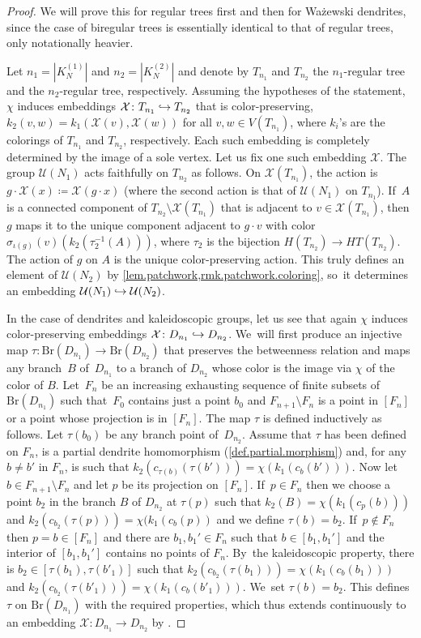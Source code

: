 \documentclass[JEP,XML,SOM,Unicode,NoFloatCountersInSection,published]{cedram}
\newcommand\hto{\mathrel{\lhook\joinrel\to}}
\theoremstyle{plain}
\theoremstyle{definition}
\theoremstyle{remark}
\newcommand{\U}{\mathcal{U}}
\newcommand{\Chi}{\mathcal{X}}
\newcommand{\Br}{\mathrm{Br}}
\begin{document}
\begin{proof}
We will prove this for regular trees first and then for Ważewski dendrites, since the case of biregular trees is essentially identical to that of regular trees, only notationally heavier.

Let $n_1 = |K_N^{(1)}|$ and $n_2 = |K_N^{(2)}|$ and denote by $T_{n_1}$ and $T_{n_2}$ the $n_1$-regular tree and the $n_2$-regular tree, respectively.
Assuming the hypotheses of the statement, $\chi$ induces embeddings $\Chi \colon T_{n_1} \hto T_{n_2}$ that is color-preserving, \ie $k_2(v,w) = k_1(\Chi(v),\Chi(w))$ for all $v,w\in V(T_{n_1})$, where $k_i$'s are the colorings of $T_{n_1}$ and $T_{n_2}$, respectively.
Each such embedding is completely determined by the image of a sole vertex.
Let us fix one such embedding $\Chi$.
The group $\U(N_1)$ acts faithfully on $T_{n_2}$ as follows.
On $\Chi(T_{n_1})$, the action is $g \cdot \Chi(x) \coloneqq \Chi(g \cdot x)$ (where the second action is that of $\U(N_1)$ on $T_{n_1}$). If~$A$ is a connected component of $T_{n_2} \setminus \Chi(T_{n_1})$ that is adjacent to $v \in \Chi(T_{n_1})$, then $g$ maps it to the unique component adjacent to $g \cdot v$ with color $\sigma_{\iota(g)}(v)\left(k_2(\tau_2^{-1}(A))\right)$, where $\tau_2$ is the bijection $H(T_{n_2}) \to HT(T_{n_2})$.
The action of $g$ on $A$ is the unique color-preserving action.
This truly defines an element of $\U(N_2)$ by \cref{lem.patchwork,rmk.patchwork.coloring}, so~it determines an embedding $\U(N_1) \hto \U(N_2)$.

In the case of dendrites and kaleidoscopic groups, let us see that again $\chi$ induces color-preserving embeddings $\Chi \colon D_{n_1} \hto D_{n_2}$. We~will first produce an injective map $\tau\colon\Br(D_{n_1})\to\Br(D_{n_2})$ that preserves the betweenness relation and maps any branch~$B$ of~$D_{n_1}$ to a branch of $D_{n_2}$ whose color is the image via $\chi$ of the color of $B$.
Let~$F_n$ be an increasing exhausting sequence of finite subsets of $\Br(D_{n_1})$ such that~$F_0$ contains just a point $b_0$ and $F_{n+1}\setminus F_n$ is a point in $[F_n]$ or a point whose projection is in $[F_n]$.
The map $\tau$ is defined inductively as follows.
Let $\tau(b_0)$ be any branch point of~$D_{n_2}$.
Assume that $\tau$ has been defined on $F_n$, is a partial dendrite homomorphism (\cref{def.partial.morphism}) and, for any $b \neq b'$ in $F_n$, is such that $k_2(c_{\tau(b)}(\tau(b'))) = \chi(k_1(c_b(b')))$.
Now let $b\in F_{n+1}\setminus F_n$ and let $p$ be its projection on $[F_n]$. If~$p\in F_n$ then we choose a point $b_2$ in the branch $B$ of $D_{n_2}$ at $\tau(p)$ such that $k_2(B)=\chi(k_1(c_p(b)))$ and $k_2(c_{b_2}(\tau(p)))=\chi(k_1(c_b(p))$ and we define $\tau(b)=b_2$. If~$p\notin F_n$ then $p=b\in [F_n]$ and there are $b_1,b_1'\in F_n$ such that $b\in [b_1,b_1']$ and the interior of $[b_1,b_1']$ contains no points of $F_n$. By~the kaleidoscopic property, there is $b_2\in [\tau(b_1), \tau(b'_1)]$ such that $k_2(c_{b_2}(\tau(b_1)))=\chi(k_1(c_b(b_1)))$ and $k_2(c_{b_2}(\tau(b'_1)))=\chi(k_1(c_b(b'_1)))$. We~set $\tau(b)=b_2$.
This defines $\tau$ on $\Br(D_{n_1})$ with the required properties, which thus extends continuously to an embedding $\Chi\colon D_{n_1}\to D_{n_2}$ by \cite[Prop.\,2.4]{Kaleidoscopic}.


\end{proof}
\end{document}
